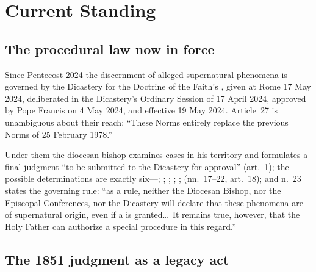 \section{Current Standing}

\subsection{The procedural law now in force}

Since Pentecost 2024 the discernment of alleged supernatural
phenomena is governed by the Dicastery for the Doctrine of the
Faith's , given at Rome 17 May 2024, deliberated in
the Dicastery's Ordinary Session of 17 April 2024, approved by Pope
Francis on 4 May 2024, and effective 19 May 2024. Article~27 is
unambiguous about their reach: ``These Norms entirely replace the
previous Norms of 25 February 1978.''

Under them the diocesan bishop examines cases in his territory and
formulates a final judgment ``to be submitted to the Dicastery for
approval'' (art.~1); the possible determinations are exactly
six---; ; ;
; ;
 (nn.~17--22, art.~18);
and n.~23 states the governing rule: ``as a rule, neither the
Diocesan Bishop, nor the Episcopal Conferences, nor the Dicastery
will declare that these phenomena are of supernatural origin, even
if a  is granted\ldots\ It remains true, however,
that the Holy Father can authorize a special procedure in this
regard.''

\subsection{The 1851 judgment as a legacy act}

